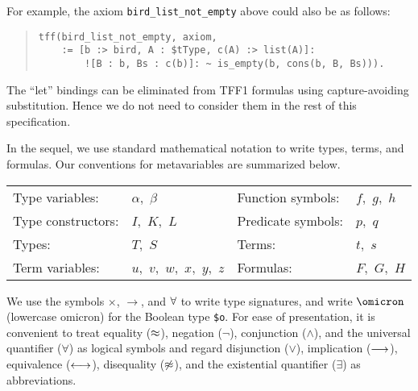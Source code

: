 For example, the axiom \verb+bird_list_not_empty+ above could also be as
follows:
\begin{quote}
\begin{verbatim}
tff(bird_list_not_empty, axiom,
    := [b :> bird, A : $tType, c(A) :> list(A)]:
        ![B : b, Bs : c(b)]: ~ is_empty(b, cons(b, B, Bs))).
\end{verbatim}
\end{quote}
%
The ``let'' bindings can be eliminated from TFF1 formulas using capture-avoiding
substitution. Hence we do not need to consider them in the rest of this
specification.

 In the sequel, we use standard
mathematical notation to write types, terms, and formulas. Our conventions
for metavariables are summarized below.
%
\begin{center}
\begin{tabular}{l@{\enskip}l@{\qquad}l@{\enskip}l}
Type variables: & $\alpha,$ $\beta$ &
  Function symbols: & $f,$ $g,$ $h$ \\
Type constructors: & $I,$ $K,$ $L$ &
  Predicate symbols: & $p,$ $q$ \\
Types: & $T,$ $S$ &
  Terms: & $t,$ $s$ \\
Term variables: & $u,$ $v,$ $w,$ $x,$ $y,$ $z$ &
  Formulas: & $F,$ $G,$ $H$
\end{tabular}
\end{center}
%

We use the symbols ${\times}$, ${\to}$, and ${\forall}$
to write type signatures, and write $\omicron$ (lowercase omicron) for the
Boolean type {\tt \$o}. For ease of presentation, it is convenient to treat
equality ($\approx$), negation ($\lnot$), conjunction ($\land$), and the universal
quantifier ($\forall$) as logical symbols and regard disjunction ($\lor$),
implication ($\longrightarrow$), equivalence ($\longleftrightarrow$), disequality ($\not\approx$), and the
existential quantifier ($\exists$) as abbreviations.

